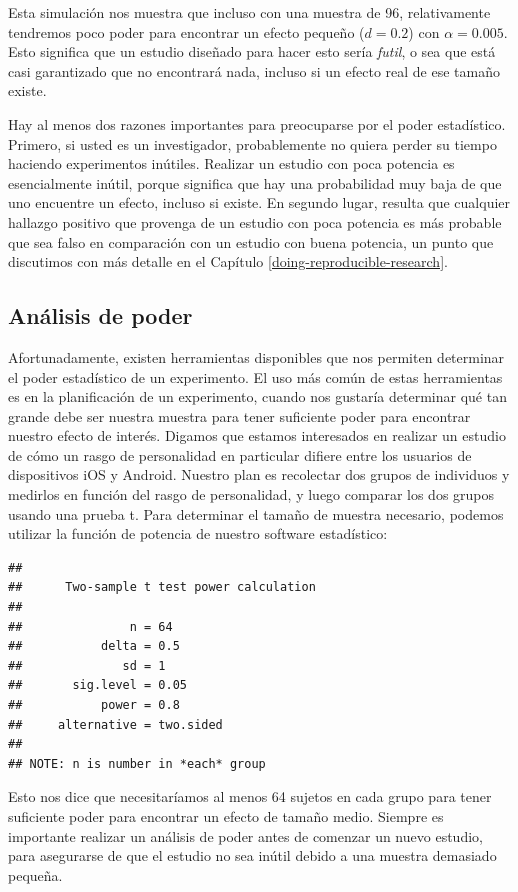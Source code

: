 \documentclass[
  12pt,
]{book}
\begin{document}
Esta simulación nos muestra que incluso con una muestra de 96, relativamente tendremos poco poder para encontrar un efecto pequeño (\(d = 0.2\)) con \(\alpha = 0.005\). Esto significa que un estudio diseñado para hacer esto sería \emph{futil}, o sea que está casi garantizado que no encontrará nada, incluso si un efecto real de ese tamaño existe.

Hay al menos dos razones importantes para preocuparse por el poder estadístico. Primero, si usted es un investigador, probablemente no quiera perder su tiempo haciendo experimentos inútiles. Realizar un estudio con poca potencia es esencialmente inútil, porque significa que hay una probabilidad muy baja de que uno encuentre un efecto, incluso si existe. En segundo lugar, resulta que cualquier hallazgo positivo que provenga de un estudio con poca potencia es más probable que sea falso en comparación con un estudio con buena potencia, un punto que discutimos con más detalle en el Capítulo \ref{doing-reproducible-research}.

\hypertarget{anuxe1lisis-de-poder}{%
\subsection{Análisis de poder}\label{anuxe1lisis-de-poder}}

Afortunadamente, existen herramientas disponibles que nos permiten determinar el poder estadístico de un experimento. El uso más común de estas herramientas es en la planificación de un experimento, cuando nos gustaría determinar qué tan grande debe ser nuestra muestra para tener suficiente poder para encontrar nuestro efecto de interés.
Digamos que estamos interesados en realizar un estudio de cómo un rasgo de personalidad en particular difiere entre los usuarios de dispositivos iOS y Android. Nuestro plan es recolectar dos grupos de individuos y medirlos en función del rasgo de personalidad, y luego comparar los dos grupos usando una prueba t. Para determinar el tamaño de muestra necesario, podemos utilizar la función de potencia de nuestro software estadístico:

\begin{verbatim}
## 
##      Two-sample t test power calculation 
## 
##               n = 64
##           delta = 0.5
##              sd = 1
##       sig.level = 0.05
##           power = 0.8
##     alternative = two.sided
## 
## NOTE: n is number in *each* group
\end{verbatim}

Esto nos dice que necesitaríamos al menos 64 sujetos en cada grupo para tener suficiente poder para encontrar un efecto de tamaño medio. Siempre es importante realizar un análisis de poder antes de comenzar un nuevo estudio, para asegurarse de que el estudio no sea inútil debido a una muestra demasiado pequeña.
\end{document}
